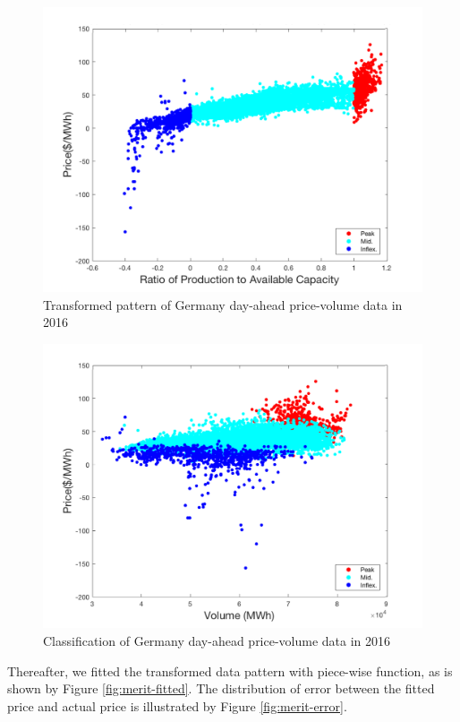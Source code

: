 \begin{figure}[h!]
	\centering
	\includegraphics[width=0.95\linewidth]{Figures/Merit-order-transformed}
	\caption{Transformed pattern of Germany day-ahead price-volume data in 2016}
	\label{fig:merit-transformed}
\end{figure}
\begin{figure}[h!]
	\centering
	\includegraphics[width=0.95\linewidth]{Figures/Merit-order-classified}
	\caption{Classification of Germany day-ahead price-volume data in 2016}
	\label{fig:merit-classified}
\end{figure}

Thereafter, we fitted the transformed data pattern with piece-wise function, as is shown by Figure \ref{fig:merit-fitted}. The distribution of error between the fitted price and actual price is illustrated by Figure \ref{fig:merit-error}.

